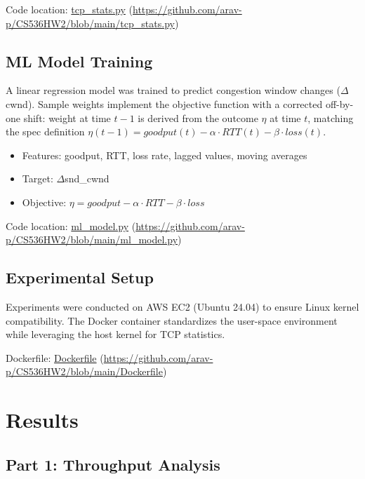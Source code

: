 \documentclass[11pt]{article}
\begin{document}
Code location: \href{https://github.com/arav-p/CS536HW2/blob/main/tcp_stats.py}{tcp\_stats.py} (\url{https://github.com/arav-p/CS536HW2/blob/main/tcp_stats.py})

\subsection{ML Model Training}

A linear regression model was trained to predict congestion window changes ($\Delta$cwnd). Sample weights implement the objective function with a corrected off-by-one shift: weight at time $t-1$ is derived from the outcome $\eta$ at time $t$, matching the spec definition $\eta(t-1) = goodput(t) - \alpha \cdot RTT(t) - \beta \cdot loss(t)$.

\begin{itemize}
    \item Features: goodput, RTT, loss rate, lagged values, moving averages
    \item Target: $\Delta$snd\_cwnd
    \item Objective: $\eta = goodput - \alpha \cdot RTT - \beta \cdot loss$
\end{itemize}

Code location: \href{https://github.com/arav-p/CS536HW2/blob/main/ml_model.py}{ml\_model.py} (\url{https://github.com/arav-p/CS536HW2/blob/main/ml_model.py})

\subsection{Experimental Setup}

Experiments were conducted on AWS EC2 (Ubuntu 24.04) to ensure Linux kernel compatibility. The Docker container standardizes the user-space environment while leveraging the host kernel for TCP statistics.

Dockerfile: \href{https://github.com/arav-p/CS536HW2/blob/main/Dockerfile}{Dockerfile} (\url{https://github.com/arav-p/CS536HW2/blob/main/Dockerfile})

\section{Results}

\subsection{Part 1: Throughput Analysis}
\end{document}
